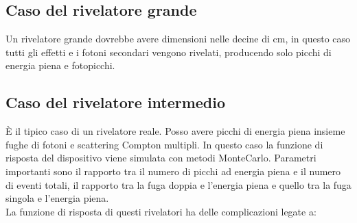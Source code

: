 \subsection{Caso del rivelatore grande}
Un rivelatore grande dovrebbe avere dimensioni nelle decine di cm, in questo caso tutti gli effetti e i fotoni secondari vengono rivelati, producendo solo 
picchi di energia piena e fotopicchi.
\subsection{Caso del rivelatore intermedio}
\`E il tipico caso di un rivelatore reale.
Posso avere picchi di energia piena insieme fughe di fotoni e scattering Compton multipli.
In questo caso la funzione di risposta del dispositivo viene simulata con metodi MonteCarlo.
Parametri importanti sono il rapporto tra il numero di picchi ad energia piena e il numero di eventi totali, il rapporto tra la fuga doppia e l'energia piena e
quello tra la fuga singola e l'energia piena.\\
La funzione di risposta di questi rivelatori ha delle complicazioni legate a:
